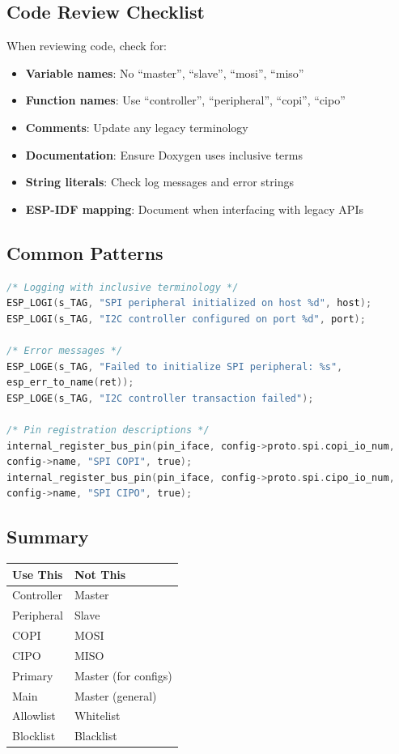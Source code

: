 \subsection{Code Review Checklist}

When reviewing code, check for:

\begin{itemize}
    \item \textbf{Variable names}: No ``master'', ``slave'', ``mosi'', ``miso''
    \item \textbf{Function names}: Use ``controller'', ``peripheral'', ``copi'', ``cipo''
    \item \textbf{Comments}: Update any legacy terminology
    \item \textbf{Documentation}: Ensure Doxygen uses inclusive terms
    \item \textbf{String literals}: Check log messages and error strings
    \item \textbf{ESP-IDF mapping}: Document when interfacing with legacy APIs
\end{itemize}

\subsection{Common Patterns}

\begin{lstlisting}[language=C]
/* Logging with inclusive terminology */
ESP_LOGI(s_TAG, "SPI peripheral initialized on host %d", host);
ESP_LOGI(s_TAG, "I2C controller configured on port %d", port);

/* Error messages */
ESP_LOGE(s_TAG, "Failed to initialize SPI peripheral: %s",
esp_err_to_name(ret));
ESP_LOGE(s_TAG, "I2C controller transaction failed");

/* Pin registration descriptions */
internal_register_bus_pin(pin_iface, config->proto.spi.copi_io_num,
config->name, "SPI COPI", true);
internal_register_bus_pin(pin_iface, config->proto.spi.cipo_io_num,
config->name, "SPI CIPO", true);
\end{lstlisting}

\subsection{Summary}

\begin{center}
\begin{tabular}{|l|l|}
\hline
\textbf{Use This} & \textbf{Not This} \\
\hline
Controller & Master \\
\hline
Peripheral & Slave \\
\hline
COPI & MOSI \\
\hline
CIPO & MISO \\
\hline
Primary & Master (for configs) \\
\hline
Main & Master (general) \\
\hline
Allowlist & Whitelist \\
\hline
Blocklist & Blacklist \\
\hline
\end{tabular}
\end{center}

